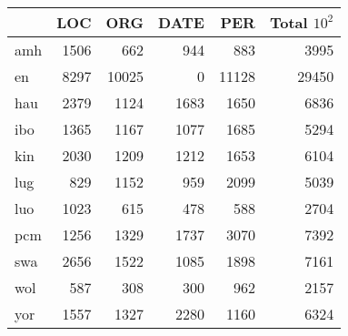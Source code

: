 \begin{tabular}{lrrrrr}
\toprule
{} &   LOC &    ORG &  DATE &    PER &  Total $10^2$ \\
\midrule
amh &  1506 &    662 &   944 &    883 &   3995 \\
en  &  8297 &  10025 &     0 &  11128 &  29450 \\
hau &  2379 &   1124 &  1683 &   1650 &   6836 \\
ibo &  1365 &   1167 &  1077 &   1685 &   5294 \\
kin &  2030 &   1209 &  1212 &   1653 &   6104 \\
lug &   829 &   1152 &   959 &   2099 &   5039 \\
luo &  1023 &    615 &   478 &    588 &   2704 \\
pcm &  1256 &   1329 &  1737 &   3070 &   7392 \\
swa &  2656 &   1522 &  1085 &   1898 &   7161 \\
wol &   587 &    308 &   300 &    962 &   2157 \\
yor &  1557 &   1327 &  2280 &   1160 &   6324 \\
\bottomrule
\end{tabular}
